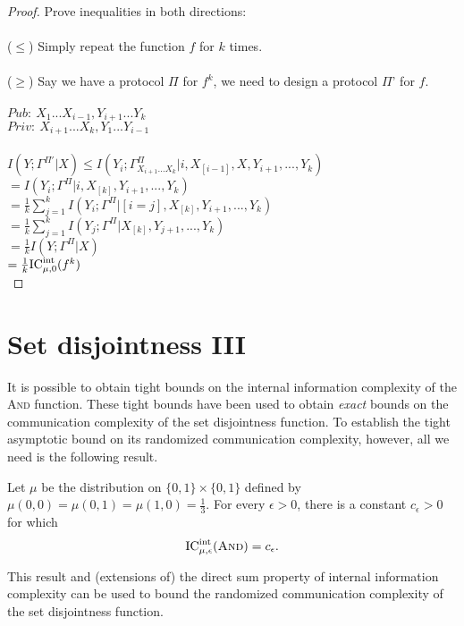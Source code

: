 \begin{proof}
	Prove inequalities in both directions:\\
	\\
	($\leq$) Simply repeat the function $f$ for $k$ times.\\
	\\
	($\ge$) Say we have a protocol $\Pi$ for $f^k$, we need to design a protocol $\Pi$' for $f$.\\
	\\
	$Pub:\ X_1...X_{i-1}, Y_{i+1}...Y_k$\\
	$Priv:\ X_{i+1}...X_k, Y_1...Y_{i-1}$\\
	\\
	$I(Y;\Gamma^{\Pi'}|X) \leq I(Y_i;\Gamma^{\Pi}_{X_{i+1}...X_k}|i,X_{[i-1]},X,Y_{i+1},...,Y_k)$\\
	$=I(Y_i;\Gamma^{\Pi}|i,X_{[k]},Y_{i+1},...,Y_k)$\\
	$=\frac1k\sum_{j=1}^{k}I(Y_i;\Gamma^{\Pi}|[i=j],X_{[k]},Y_{i+1},...,Y_k)$\\
	$=\frac1k\sum_{j=1}^{k}I(Y_j;\Gamma^{\Pi}|X_{[k]},Y_{j+1},...,Y_k)$\\
	$=\frac1kI(Y;\Gamma^{\Pi}|X)$\\
	$=\frac1k\mathrm{IC}^{\mathrm{int}}_{\mu,0}(f^k)$\\
\end{proof}



\section{Set disjointness III}

It is possible to obtain tight bounds on the internal information complexity of the \textsc{And} function. These tight bounds have been used to obtain \emph{exact} bounds on the communication complexity of the set disjointness function. To establish the tight asymptotic bound on its randomized communication complexity, however, all we need is the following result.

\begin{lemma}
	Let $\mu$ be the distribution on $\{0,1\} \times \{0,1\}$ defined by $\mu(0,0) = \mu(0,1) = \mu(1,0) = \frac13$.
	For every $\epsilon > 0$, there is a constant $c_\epsilon > 0$ for which
	\[
	\mathrm{IC}^{\mathrm{int}}_{\mu,\epsilon}(\textsc{And}) = c_\epsilon.
	\]
\end{lemma}

This result and (extensions of) the direct sum property of internal information complexity can be used to bound the randomized communication complexity of the set disjointness function.


